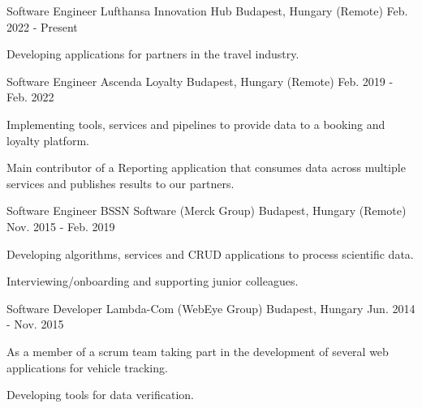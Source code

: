 

\begin{cventries}

\cventry
{Software Engineer} %
{Lufthansa Innovation Hub} %
{Budapest, Hungary (Remote)} %
{Feb. 2022 - Present} %
{
	\begin{cvitems} %
		\item {Developing applications for partners in the travel industry.}
	\end{cvitems}
}

\cventry
{Software Engineer} %
{Ascenda Loyalty} %
{Budapest, Hungary (Remote)} %
{Feb. 2019 - Feb. 2022} %
{
  \begin{cvitems} %
    \item {Implementing tools, services and pipelines to provide data to a booking and loyalty platform.}
    \item {Main contributor of a Reporting application that consumes data across multiple services and publishes results to our partners.}
  \end{cvitems}
}

  \cventry
    {Software Engineer} %
    {BSSN Software (Merck Group)} %
    {Budapest, Hungary (Remote)} %
    {Nov. 2015 - Feb. 2019} %
    {
      \begin{cvitems} %
        \item {Developing algorithms, services and CRUD applications to process scientific data.}
		    \item {Interviewing/onboarding and supporting junior colleagues.}
      \end{cvitems}
    }

  \cventry
    {Software Developer} %
    {Lambda-Com (WebEye Group)} %
    {Budapest, Hungary} %
    {Jun. 2014 - Nov. 2015} %
    {
      \begin{cvitems} %
        \item {As a member of a scrum team taking part in the development of several web applications for vehicle tracking.}
        \item {Developing tools for data verification.}
      \end{cvitems}
    }

\end{cventries}

